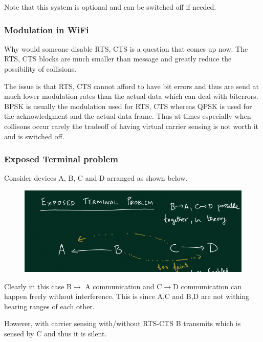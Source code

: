 \documentclass[12pt]{article}
\newcommand{\tbox}[1]{\noindent\fbox{\parbox{\textwidth}{#1}}}
\begin{document}
Note that this system is optional and can be switched off if needed. 



\noindent\tbox{
    \begin{center}
    \textbf{\Huge Lecture 17}
    \end{center}
}


\subsubsection{Modulation in WiFi}
Why would someone disable RTS, CTS is a question that comes up now. The RTS, CTS 
blocks are much smaller than message and greatly reduce the possibility of collisions. 

The issue is that RTS, CTS cannot afford to have bit errors and thus are send at much lower 
modulation rates than the actual data which can deal with biterrors. BPSK is usually 
the modulation used for RTS, CTS whereas QPSK is used for the acknowledgment and the actual data frame. 
Thus at times especially when collisons occur rarely the tradeoff of having virtual carrier sensing is not 
worth it and is switched off. 


\subsubsection{Exposed Terminal problem}

Consider devices A, B, C and D arranged as shown below. 

\begin{figure}
    \includegraphics{Diagrams/Exposed_terminal.png}
\end{figure}

Clearly in this case B\(\rightarrow\) A communication and C\( \rightarrow\)D communication can happen
freely without interference. This is since A,C and B,D are not withing hearing ranges of each other. 

However, with carrier sensing with/without RTS-CTS B transmits which is sensed by C and thus it is silent. 
\end{document}
